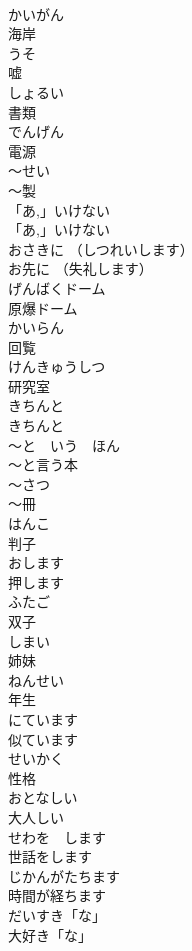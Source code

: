\documentclass[8pt]{extreport}
\begin{document}
\begin{CJK}{UTF8}{min}
\\	かいがん	
\\	海岸		
\\	うそ	
\\	嘘	
\\	しょるい	
\\	書類	
\\	でんげん	
\\	電源		
\\	〜せい	
\\	〜製		
\\	「あ,」いけない	
\\	「あ,」いけない	
\\	おさきに （しつれいします）	
\\	お先に （失礼します）	
\\	げんばくドーム	
\\	原爆ドーム		
\\	かいらん	
\\	回覧		
\\	けんきゅうしつ	
\\	研究室		
\\	きちんと	
\\	きちんと		
\\	〜と　いう　ほん	
\\	〜と言う本		
\\	〜さつ	
\\	〜冊		
\\	はんこ	
\\	判子		
\\	おします	
\\	押します 
\\	ふたご	
\\	双子		
\\	しまい	
\\	姉妹		
\\	ねんせい	
\\	年生		
\\	にています	
\\	似ています		
\\	せいかく	
\\	性格		
\\	おとなしい	
\\	大人しい		
\\	せわを　します	
\\	世話をします		
\\	じかんがたちます	
\\	時間が経ちます		
\\	だいすき「な」	
\\	大好き「な」		

\end{CJK}
\end{document}
